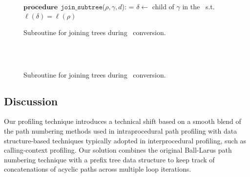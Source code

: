 \ifdefined\noauthorea
\begin{figure}[ht!]
\IncMargin{2em}
\begin{algorithm}[H]
\DontPrintSemicolon
\LinesNumbered
\SetAlgoNoLine
\SetNlSkip{1em} 
\Indm\Indmm
\hrulefill\\
$\mathbf{procedure} \> \> \texttt{join\_subtree}$($\rho,\gamma,d$):\;
\vspace{1mm}
\everypar={\nl}
\Indp\Indpp
$\delta\gets$ child of $\gamma$ in the \kipf\ s.t. $\ell(\delta)=\ell(\rho)$\;
\vspace{-2mm}
\Indm\Indmm
\nonl\hrulefill\vspace{1mm}\\
\DecMargin{1.0em}
\caption{\label{alg:kblpp-join-subtrees} Subroutine for joining trees during \ksf\ conversion.}
\DecMargin{1.0em}
\end{algorithm}
\end{figure}

\else
\begin{figure}[ht]
\caption{\label{alg:kblpp-join-subtrees} Subroutine for joining trees during \ksf\ conversion.}
\begin{small}
\begin{minipage}{0.9\textwidth}
\hrulefill\\
\algmissing\

\vspace{-1mm}
\hrulefill
\vspace{-2mm}
\end{minipage}
\end{small}
\end{figure}
\fi


\subsection{Discussion}

Our profiling technique introduces a technical shift based on a smooth blend of the path numbering methods used in intraprocedural path profiling with data structure-based techniques typically adopted in interprocedural profiling, such as calling-context profiling. Our solution combines the original Ball-Larus path numbering technique with a prefix tree data structure to keep track of concatenations of acyclic paths across multiple loop iterations.


